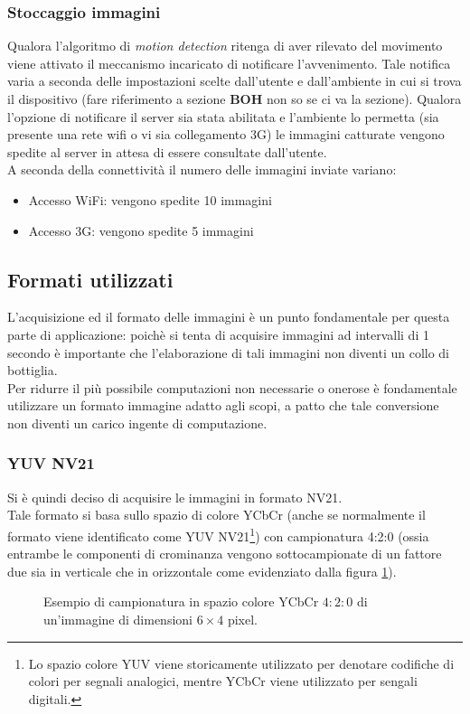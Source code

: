 \subsubsection{Stoccaggio immagini}
Qualora l'algoritmo di \textit{motion detection} ritenga di aver rilevato del movimento viene attivato il meccanismo incaricato di notificare l'avvenimento. Tale notifica varia a seconda delle impostazioni scelte dall'utente e dall'ambiente in cui si trova il dispositivo (fare riferimento a sezione \textbf{BOH} non so se ci va la sezione). Qualora l'opzione di notificare il server sia stata abilitata e l'ambiente lo permetta (sia presente una rete wifi o vi sia collegamento 3G) le immagini catturate vengono spedite al server in attesa di essere consultate dall'utente.\\
A seconda della connettività il numero delle immagini inviate variano:
\begin{itemize}
  \item Accesso WiFi: vengono spedite 10 immagini
  \item Accesso 3G: vengono spedite 5 immagini
\end{itemize}

\subsection{Formati utilizzati}
L'acquisizione ed il formato delle immagini è un punto fondamentale per questa parte di applicazione: poichè si tenta di acquisire immagini ad intervalli di 1 secondo è importante che l'elaborazione di tali immagini non diventi un collo di bottiglia.\\

Per ridurre il più possibile computazioni non necessarie o onerose è fondamentale utilizzare un formato immagine adatto agli scopi, a patto che tale conversione non diventi un carico ingente di computazione.\\

\subsubsection{YUV NV21}
Si è quindi deciso di acquisire le immagini in formato NV21.\\
Tale formato si basa sullo spazio di colore YCbCr (anche se normalmente il formato viene identificato come YUV NV21\footnote{ Lo spazio colore YUV viene storicamente utilizzato per denotare codifiche di colori per segnali analogici, mentre YCbCr viene utilizzato per sengali digitali.}) con campionatura 4:2:0 (ossia entrambe le componenti di crominanza vengono sottocampionate di un fattore due sia in verticale che in orizzontale come evidenziato dalla figura \ref{YUVsampling}).\\
\begin{figure}[!ht]
\begin{center}
\YUVsampling
\end{center}
\caption{Esempio di campionatura in spazio colore YCbCr $4:2:0$ di un'immagine di dimensioni $6×4$ pixel.}
\label{YUVsampling}
\end{figure}

